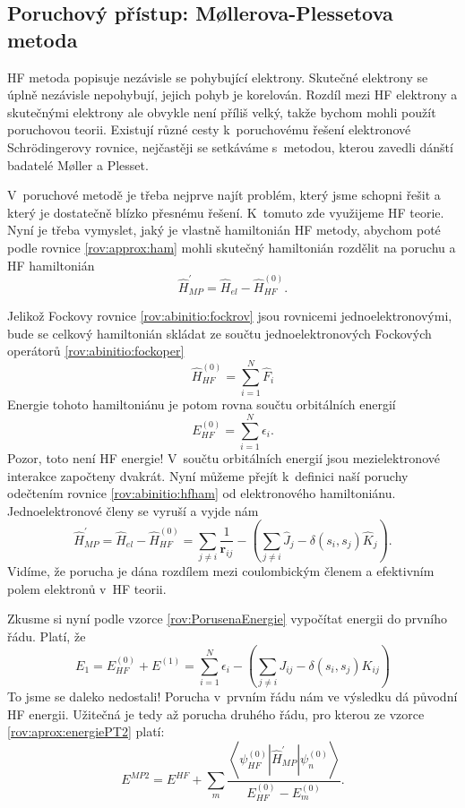 \subsection{Poruchový přístup: M\o llerova-Plessetova metoda}
HF metoda popisuje nezávisle se pohybující elektrony. Skutečné elektrony se úplně nezávisle nepohybují, jejich pohyb je korelován. Rozdíl mezi HF elektrony a skutečnými elektrony ale obvykle není příliš velký, takže bychom mohli použít poruchovou teorii.  Existují různé cesty k~poruchovému řešení elektronové Schr\"{o}dingerovy rovnice, nejčastěji se setkáváme s~metodou, kterou zavedli dánští badatelé M\o ller a Plesset.

V~poruchové metodě je třeba nejprve najít problém, který jsme schopni řešit a který je dostatečně blízko přesnému řešení. K~tomuto zde využijeme HF teorie. Nyní je třeba vymyslet, jaký je vlastně hamiltonián HF metody, abychom poté podle rovnice \eqref{rov:approx:ham} mohli skutečný hamiltonián rozdělit na poruchu a HF hamiltonián
\begin{equation}
\hat{H}^{\prime}_{MP}=\hat{H}_{el} - \hat{H}^{(0)}_{HF} .
\end{equation}

Jelikož Fockovy rovnice \ref{rov:abinitio:fockrov} jsou rovnicemi jednoelektronovými, bude se celkový hamiltonián skládat ze součtu jednoelektronových Fockových operátorů \ref{rov:abinitio:fockoper}
\begin{equation}
\hat{H}^{(0)}_{HF}= \sum_{i=1}^N \hat{F}_i
\label{rov:abinitio:hfham}
\end{equation}
Energie tohoto hamiltoniánu je potom rovna součtu orbitálních energií
\begin{equation}
E^{(0)}_{HF}=\sum_{i=1}^N \epsilon_i .
\end{equation}
Pozor, toto není HF energie! V~součtu orbitálních energií jsou mezielektronové interakce započteny dvakrát. Nyní můžeme přejít k~definici naší poruchy odečtením rovnice \eqref{rov:abinitio:hfham} od elektronového hamiltoniánu. Jednoelektronové členy se vyruší a vyjde nám
\begin{equation}
\hat{H}^{\prime}_{MP}=\hat{H}_{el}-\hat{H}^{(0)}_{HF}= \sum_{j\neq i} \frac{1}{\textbf{r}_{ij}} - \left(\sum_{j\neq i} \hat{J}_j - \delta(s_i,s_j) \hat{K}_j \right) .
\end{equation}
Vidíme, že porucha je dána rozdílem mezi coulombickým členem a efektivním polem elektronů v~HF teorii.

Zkusme si nyní podle vzorce \eqref{rov:PorusenaEnergie} vypočítat energii do prvního řádu. Platí, že
\begin{equation}
E_1=E^{(0)}_{HF} + E^{(1)}= \sum_{i=1}^N \epsilon_i - \left(\sum_{j\neq i} J_{ij} - \delta(s_i,s_j) {K}_{ij} \right)
\end{equation}
To jsme se daleko nedostali! Porucha v~prvním řádu nám ve výsledku dá původní HF energii.
Užitečná je tedy až porucha druhého řádu, pro kterou ze vzorce \eqref{rov:aprox:energiePT2} platí:
\begin{equation}
E^{MP2} = E^{HF} + \sum_m \frac{\left < \psi^{(0)}_{HF}|\hat{H}^{\prime}_{MP}|\psi_n^{(0)} \right >}{E_{HF}^{(0)}-E_m^{(0)}}.
\end{equation}

